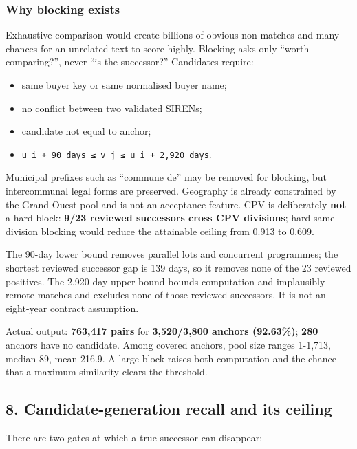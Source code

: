 \subsubsection{Why blocking exists}\label{why-blocking-exists}

Exhaustive comparison would create billions of obvious non-matches and
many chances for an unrelated text to score highly. Blocking asks only
``worth comparing?'', never ``is the successor?'' Candidates require:

\begin{itemize}
\tightlist
\item
  same buyer key or same normalised buyer name;
\item
  no conflict between two validated SIRENs;
\item
  candidate not equal to anchor;
\item
  \texttt{u\_i\ +\ 90\ days\ ≤\ v\_j\ ≤\ u\_i\ +\ 2,920\ days}.
\end{itemize}

Municipal prefixes such as ``commune de'' may be removed for blocking,
but intercommunal legal forms are preserved. Geography is already
constrained by the Grand Ouest pool and is not an acceptance feature.
CPV is deliberately \textbf{not} a hard block: \textbf{9/23 reviewed
successors cross CPV divisions}; hard same-division blocking would
reduce the attainable ceiling from 0.913 to 0.609.

The 90-day lower bound removes parallel lots and concurrent programmes;
the shortest reviewed successor gap is 139 days, so it removes none of
the 23 reviewed positives. The 2,920-day upper bound bounds computation
and implausibly remote matches and excludes none of those reviewed
successors. It is not an eight-year contract assumption.

Actual output: \textbf{763,417 pairs} for \textbf{3,520/3,800 anchors
(92.63\%)}; \textbf{280} anchors have no candidate. Among covered
anchors, pool size ranges 1-1,713, median 89, mean 216.9. A large block
raises both computation and the chance that a maximum similarity clears
the threshold.

\subsection{8. Candidate-generation recall and its
ceiling}\label{8-candidate-generation-recall-and-its-ceiling}

There are two gates at which a true successor can disappear:

